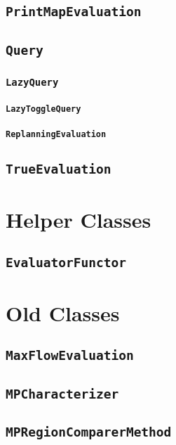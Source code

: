 \subsection{\texttt{PrintMapEvaluation}}

\subsection{\texttt{Query}}

\subsubsection{\texttt{LazyQuery}}

\paragraph{\texttt{LazyToggleQuery}}

\paragraph{\texttt{ReplanningEvaluation}}

\subsection{\texttt{TrueEvaluation}}

\section{Helper Classes}

\subsection{\texttt{EvaluatorFunctor}}

\section{Old Classes}

\subsection{\texttt{MaxFlowEvaluation}}

\subsection{\texttt{MPCharacterizer}}

\subsection{\texttt{MPRegionComparerMethod}}


